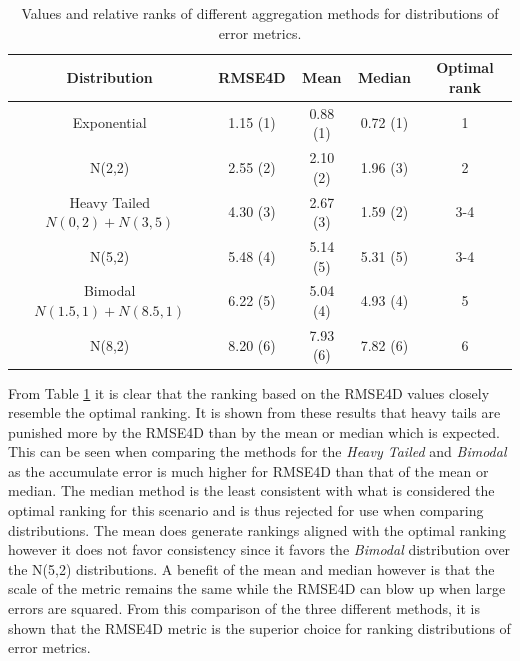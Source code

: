 \begin{table}[htp]
    \centering
    \begin{tabular}{ccccc}
        Distribution                     & RMSE4D   & Mean     & Median   & Optimal rank \\
        \hline
        Exponential                      & 1.15 (1) & 0.88 (1) & 0.72 (1) & 1            \\
        \hline
        N(2,2)                           & 2.55 (2) & 2.10 (2) & 1.96 (3) & 2            \\
        \hline
        Heavy Tailed \(N(0,2) + N(3,5)\) & 4.30 (3) & 2.67 (3) & 1.59 (2) & 3-4          \\
        \hline
        N(5,2)                           & 5.48 (4) & 5.14 (5) & 5.31 (5) & 3-4          \\
        \hline
        Bimodal \(N(1.5,1) + N(8.5,1)\)  & 6.22 (5) & 5.04 (4) & 4.93 (4) & 5            \\ %
        \hline
        N(8,2)                           & 8.20 (6) & 7.93 (6) & 7.82 (6) & 6            \\
        \hline
    \end{tabular}
    \caption{Values and relative ranks of different aggregation methods for distributions of error metrics.}
    \label{tab:evaluation_crayon_score}
\end{table}

From Table \ref{tab:evaluation_crayon_score} it is clear that the ranking based on the RMSE4D values closely resemble the optimal ranking. It is shown from these results that heavy tails are punished more by the RMSE4D than by the mean or median which is expected. This can be seen when comparing the methods for the \textit{Heavy Tailed} and \textit{Bimodal} as the accumulate error is much higher for RMSE4D than that of the mean or median. The median method is the least consistent with what is considered the optimal ranking for this scenario and is thus rejected for use when comparing distributions. The mean does generate rankings aligned with the optimal ranking however it does not favor consistency since it favors the \textit{Bimodal} distribution over the N(5,2) distributions. A benefit of the mean and median however is that the scale of the metric remains the same while the RMSE4D can blow up when large errors are squared. From this comparison of the three different methods, it is shown that the RMSE4D metric is the superior choice for ranking distributions of error metrics.

